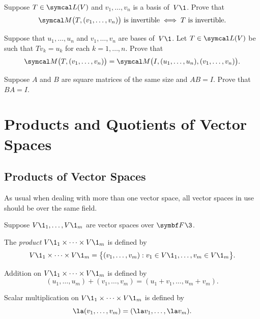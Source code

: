\begin{exercises}

\exercise
Suppose $T \in \L(V)$ and $v_1, \dots, v_n$ is a basis of~$V\1$.  Prove that
\[
\M\bigl(T, (v_1, \dots, v_n) \bigr) \text{ is invertible} \iff T \text{ is invertible}.
\]
\exercisedisplayend


\exercise
Suppose that $u_1, \dots, u_n$ and $v_1, \dots, v_n$ are bases of~$V\1$.  Let
$T \in \L(V)$ be such that $Tv_k = u_k$ for each
$k = 1, \dots, n$.  Prove that
\[
\M\bigl( T, (v_1, \dots, v_n) \bigr) =
\M\bigl(I, (u_1, \dots, u_n), (v_1, \dots, v_n)\bigr).
\]
\exercisedisplayend


\exercise
Suppose $A$ and $B$ are square matrices of the same size and $AB = I$. Prove that $BA = I$.


\end{exercises}

\section{Products and Quotients of Vector Spaces}
\label{pq}

\subsection{Products of Vector Spaces}

As usual when dealing with more than one vector space, all vector spaces in use should be over the same field.

{Suppose $V\1_1, \dots, V\1_m$ are vector spaces over $\F{}\3$.
\begin{Itemize}
\item
The \emph{product} $V\1_1 \times \dots \times V\1_m$ is defined by
\[
V\1_1 \times \dots \times V\1_m = \br[\big]{(v_1, \dots, v_m): v_1 \in V\1_1, \dots, v_m \in V\1_m}.
\]
\item
Addition on $V\1_1 \times \dots \times V\1_m$ is defined by
\[
(u_1, \dots, u_m) + (v_1, \dots, v_m) = (u_1 + v_1, \dots, u_m + v_m).
\]
\item
Scalar multiplication on $V\1_1 \times \dots \times V\1_m$ is defined by
\[
\la (v_1, \dots, v_m) = (\la v_1, \dots, \la v_m).
\]
\end{Itemize}}

